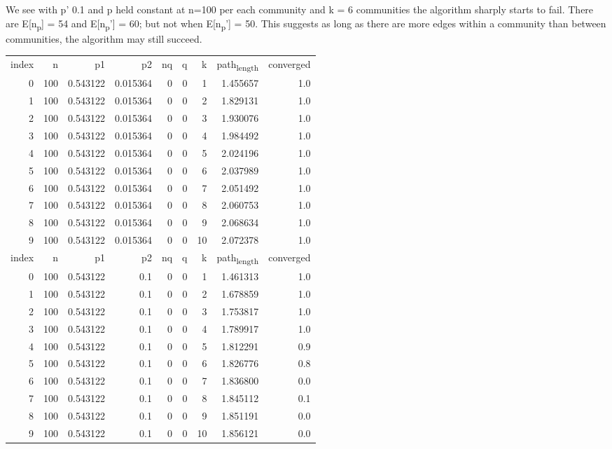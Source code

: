 \documentclass[11pt]{article}
\begin{document}
We see with p' 0.1 and p held constant at n=100 per each community and k = 6 communities the algorithm sharply
starts to fail. There are E[n\textsubscript{p}] = 54 and E[n\textsubscript{p}'] = 60; but not when E[n\textsubscript{p}'] = 50. This suggests as long as
there are more edges within a community than between communities, the algorithm may still succeed.

\begin{center}
\begin{tabular}{rrrrrrrrr}
index & n & p1 & p2 & nq & q & k & path\textsubscript{length} & converged\\
0 & 100 & 0.543122 & 0.015364 & 0 & 0 & 1 & 1.455657 & 1.0\\
1 & 100 & 0.543122 & 0.015364 & 0 & 0 & 2 & 1.829131 & 1.0\\
2 & 100 & 0.543122 & 0.015364 & 0 & 0 & 3 & 1.930076 & 1.0\\
3 & 100 & 0.543122 & 0.015364 & 0 & 0 & 4 & 1.984492 & 1.0\\
4 & 100 & 0.543122 & 0.015364 & 0 & 0 & 5 & 2.024196 & 1.0\\
5 & 100 & 0.543122 & 0.015364 & 0 & 0 & 6 & 2.037989 & 1.0\\
6 & 100 & 0.543122 & 0.015364 & 0 & 0 & 7 & 2.051492 & 1.0\\
7 & 100 & 0.543122 & 0.015364 & 0 & 0 & 8 & 2.060753 & 1.0\\
8 & 100 & 0.543122 & 0.015364 & 0 & 0 & 9 & 2.068634 & 1.0\\
9 & 100 & 0.543122 & 0.015364 & 0 & 0 & 10 & 2.072378 & 1.0\\
index & n & p1 & p2 & nq & q & k & path\textsubscript{length} & converged\\
0 & 100 & 0.543122 & 0.1 & 0 & 0 & 1 & 1.461313 & 1.0\\
1 & 100 & 0.543122 & 0.1 & 0 & 0 & 2 & 1.678859 & 1.0\\
2 & 100 & 0.543122 & 0.1 & 0 & 0 & 3 & 1.753817 & 1.0\\
3 & 100 & 0.543122 & 0.1 & 0 & 0 & 4 & 1.789917 & 1.0\\
4 & 100 & 0.543122 & 0.1 & 0 & 0 & 5 & 1.812291 & 0.9\\
5 & 100 & 0.543122 & 0.1 & 0 & 0 & 6 & 1.826776 & 0.8\\
6 & 100 & 0.543122 & 0.1 & 0 & 0 & 7 & 1.836800 & 0.0\\
7 & 100 & 0.543122 & 0.1 & 0 & 0 & 8 & 1.845112 & 0.1\\
8 & 100 & 0.543122 & 0.1 & 0 & 0 & 9 & 1.851191 & 0.0\\
9 & 100 & 0.543122 & 0.1 & 0 & 0 & 10 & 1.856121 & 0.0\\
\end{tabular}
\end{center}
\end{document}
